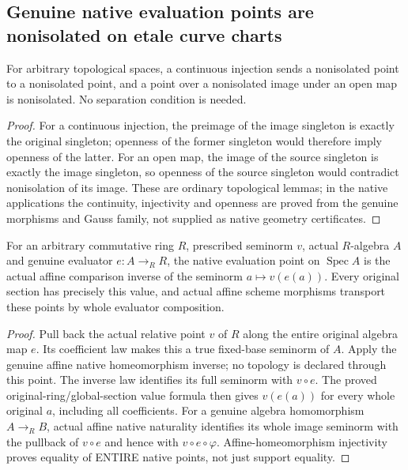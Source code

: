 \subsection{Genuine native evaluation points are nonisolated on etale curve charts}
\label{subsec:etale-curve-nonisolation}

\begin{lemma}
\label{topology:actual-open-map-nonisolation}
For arbitrary topological spaces, a continuous injection sends a
nonisolated point to a nonisolated point, and a point over a
nonisolated image under an open map is nonisolated. No separation
condition is needed.
\leanok
\end{lemma}
\begin{proof}
For a continuous injection, the preimage of the image singleton is
exactly the original singleton; openness of the former singleton
would therefore imply openness of the latter. For an open map,
the image of the source singleton is exactly the image singleton,
so openness of the source singleton would contradict nonisolation
of its image. These are ordinary topological lemmas; in the native
applications the continuity, injectivity and openness are proved
from the genuine morphisms and Gauss family, not supplied as native
geometry certificates.
\end{proof}

\begin{definition}
\label{scheme:actual-native-rational-evaluation}

For an arbitrary commutative ring $R$, prescribed seminorm $v$,
actual $R$-algebra $A$ and genuine evaluator $e:A\to_R R$, the
native evaluation point on $\operatorname{Spec}A$ is the actual
affine comparison inverse of the seminorm $a\mapsto v(e(a))$.
Every original section has precisely this value, and actual affine
scheme morphisms transport these points by whole evaluator
composition.
\end{definition}
\begin{proof}
Pull back the actual relative point $v$ of $R$ along the entire
original algebra map $e$. Its coefficient law makes this a true
fixed-base seminorm of $A$. Apply the genuine affine native
homeomorphism inverse; no topology is declared through this point.
The inverse law identifies its full seminorm with $v\circ e$.
The proved original-ring/global-section value formula then gives
$v(e(a))$ for every whole original $a$, including all coefficients.
For a genuine algebra homomorphism $A\to_R B$, actual affine
native naturality identifies its whole image seminorm with the
pullback of $v\circ e$ and hence with $v\circ e\circ\varphi$.
Affine-homeomorphism injectivity proves equality of ENTIRE native
points, not just support equality.
\end{proof}

